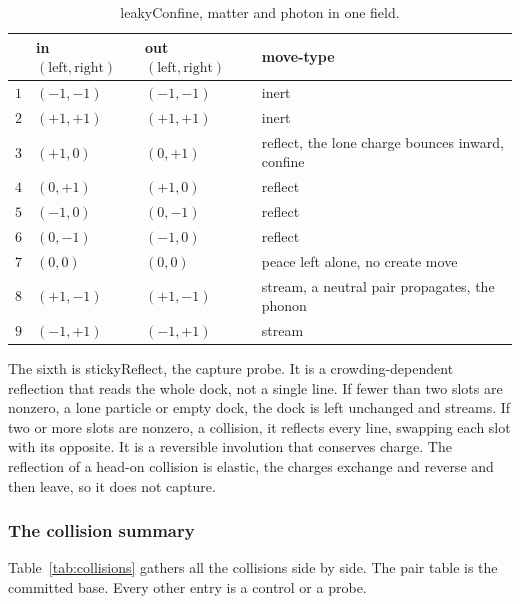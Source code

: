 \begin{table}[ht]
\centering
\begin{tabular}{@{}llll@{}}
\toprule
 & in $(\text{left}, \text{right})$ & out $(\text{left}, \text{right})$ & move-type \\
\midrule
$1$ & $(-1,-1)$ & $(-1,-1)$ & inert \\
$2$ & $(+1,+1)$ & $(+1,+1)$ & inert \\
$3$ & $(+1,0)$ & $(0,+1)$ & reflect, the lone charge bounces inward, confine \\
$4$ & $(0,+1)$ & $(+1,0)$ & reflect \\
$5$ & $(-1,0)$ & $(0,-1)$ & reflect \\
$6$ & $(0,-1)$ & $(-1,0)$ & reflect \\
$7$ & $(0,0)$ & $(0,0)$ & peace left alone, no create move \\
$8$ & $(+1,-1)$ & $(+1,-1)$ & stream, a neutral pair propagates, the phonon \\
$9$ & $(-1,+1)$ & $(-1,+1)$ & stream \\
\bottomrule
\end{tabular}
\caption{leakyConfine, matter and photon in one field.}
\label{tab:leaky}
\end{table}

The sixth is stickyReflect, the capture probe. It is a crowding-dependent reflection that reads the whole dock, not a single line. If fewer than two slots are nonzero, a lone particle or empty dock, the dock is left unchanged and streams. If two or more slots are nonzero, a collision, it reflects every line, swapping each slot with its opposite. It is a reversible involution that conserves charge. The reflection of a head-on collision is elastic, the charges exchange and reverse and then leave, so it does not capture.

\subsubsection{The collision summary}

Table~\ref{tab:collisions} gathers all the collisions side by side. The pair table is the committed base. Every other entry is a control or a probe.

